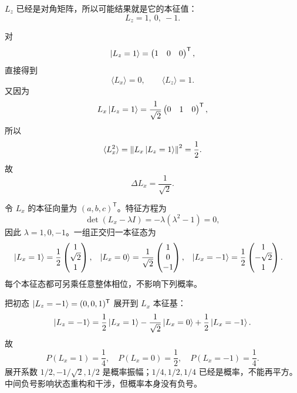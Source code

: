 \begin{checkedsolution}
$L_z$ 已经是对角矩阵，所以可能结果就是它的本征值：
\begin{equation}
  \boxed{L_z=1,\ 0,\ -1.}
  \label{eq:QM-C04-S01-E01-Lz-outcomes}
\end{equation}

对
\[
  \left|L_z=1\right\rangle=\begin{pmatrix}1&0&0\end{pmatrix}^{\mathsf T},
\]
直接得到
\begin{equation}
  \langle L_x\rangle=0,
  \qquad
  \langle L_z\rangle=1.
  \label{eq:QM-C04-S01-E01-first-moments}
\end{equation}
又因为
\[
  L_x\left|L_z=1\right\rangle
  =\frac1{\sqrt2}\begin{pmatrix}0&1&0\end{pmatrix}^{\mathsf T},
\]
所以
\[
  \langle L_x^2\rangle
  =\left\|L_x\left|L_z=1\right\rangle\right\|^2
  =\frac12.
\]
故
\begin{equation}
  \boxed{\Delta L_x=\frac1{\sqrt2}.}
  \label{eq:QM-C04-S01-E01-Lx-uncertainty}
\end{equation}

令 $L_x$ 的本征向量为 $(a,b,c)^{\mathsf T}$。特征方程为
\begin{equation}
  \det(L_x-\lambda I)
  =-\lambda(\lambda^2-1)=0,
  \label{eq:QM-C04-S01-E01-Lx-characteristic}
\end{equation}
因此 $\lambda=1,0,-1$。一组正交归一本征态为
\begin{align}
  \left|L_x=1\right\rangle
  &=\frac12
    \begin{pmatrix}1\\\sqrt2\\1\end{pmatrix},
  &
  \left|L_x=0\right\rangle
  &=\frac1{\sqrt2}
    \begin{pmatrix}1\\0\\-1\end{pmatrix},
  &
  \left|L_x=-1\right\rangle
  &=\frac12
    \begin{pmatrix}1\\-\sqrt2\\1\end{pmatrix}.
  \label{eq:QM-C04-S01-E01-Lx-eigenvectors}
\end{align}
每个本征态都可另乘任意整体相位，不影响下列概率。

把初态 $\left|L_z=-1\right\rangle=(0,0,1)^{\mathsf T}$ 展开到 $L_x$ 本征基：
\begin{equation}
  \left|L_z=-1\right\rangle
  =\frac12\left|L_x=1\right\rangle
   -\frac1{\sqrt2}\left|L_x=0\right\rangle
   +\frac12\left|L_x=-1\right\rangle.
  \label{eq:QM-C04-S01-E01-zminus-in-x-basis}
\end{equation}
故
\begin{equation}
  \boxed{
  P(L_x=1)=\frac14,
  \quad P(L_x=0)=\frac12,
  \quad P(L_x=-1)=\frac14.}
  \label{eq:QM-C04-S01-E01-zminus-Lx-probabilities}
\end{equation}
展开系数 $1/2,-1/\sqrt2,1/2$ 是概率振幅；$1/4,1/2,1/4$ 已经是概率，不能再平方。中间负号影响状态重构和干涉，但概率本身没有负号。


\end{checkedsolution}

